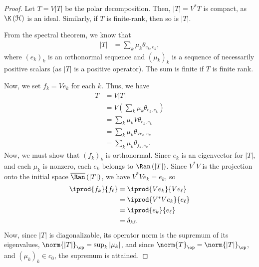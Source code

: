 \documentclass[10pt]{mypackage}
\begin{document}
\begin{proof}
  Let $T = V\left\vert T \right\vert$ be the polar decomposition. Then, $\left\vert T \right\vert = V^{\ast}T$ is compact, as $\K\left( \mathcal{H} \right)$ is an ideal. Similarly, if $T$ is finite-rank, then so is $\left\vert T \right\vert$.\newline

  From the spectral theorem, we know that
  \begin{align*}
    \left\vert T \right\vert &= \sum_{k}\mu_k\theta_{e_k,e_k},
  \end{align*}
  where $\left( e_k \right)_k$ is an orthonormal sequence and $\left( \mu_k \right)_k$ is a sequence of necessarily positive scalars (as $\left\vert T \right\vert$ is a positive operator). The sum is finite if $T$ is finite rank.\newline

  Now, we set $f_k = Ve_k$ for each $k$. Thus, we have
  \begin{align*}
    T &= V\left\vert T \right\vert\\
      &= V\left( \sum_{k}\mu_k\theta_{e_k,e_k} \right)\\
      &= \sum_{k}\mu_kV\theta_{e_k,e_k}\\
      &= \sum_{k}\mu_{k}\theta_{Ve_k,e_k}\\
      &= \sum_{k}\mu_k\theta_{f_k,e_k}.
  \end{align*}
  Now, we must show that $\left( f_k \right)_k$ is orthonormal. Since $e_k$ is an eigenvector for $\left\vert T \right\vert$, and each $\mu_k$ is nonzero, each $e_k$ belongs to $\Ran\left( \left\vert T \right\vert \right)$. Since $V^{\ast}V$ is the projection onto the initial space $\overline{\Ran}\left( \left\vert T \right\vert \right)$, we have $V^{\ast}Ve_k = e_k$, so
  \begin{align*}
    \iprod{f_k}{f_{\ell}} &= \iprod{Ve_k}{Ve_{\ell}}\\
                          &= \iprod{V^{\ast}Ve_k}{e_{\ell}}\\
                          &= \iprod{e_k}{e_{\ell}}\\
                          &= \delta_{k\ell}.
  \end{align*}
  Now, since $\left\vert T \right\vert$ is diagonalizable, its operator norm is the supremum of its eigenvalues, $\norm{\left\vert T \right\vert}_{\op} = \sup_{k}\left\vert \mu_k \right\vert$, and since $\norm{T}_{\op} = \norm{\left\vert T \right\vert}_{\op}$, and $\left( \mu_k \right)_{k}\in c_0$, the supremum is attained.
\end{proof}
\end{document}
